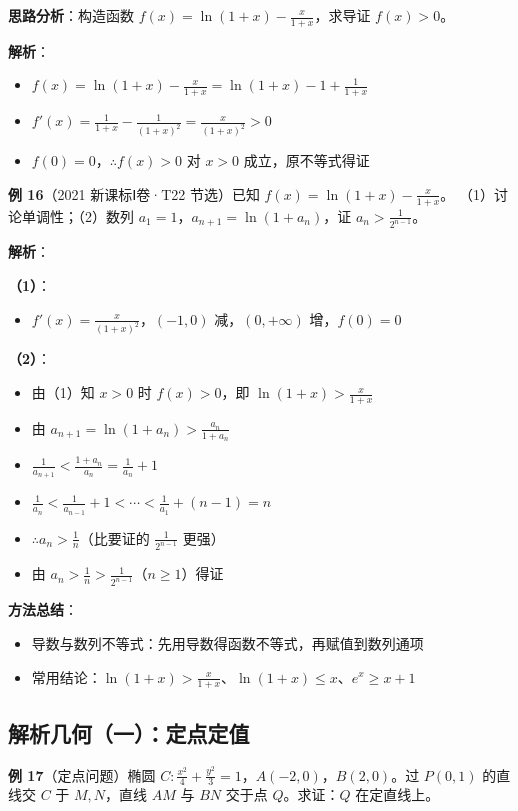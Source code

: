 \textbf{思路分析}：构造函数 $f(x)=\ln(1+x)-\frac{x}{1+x}$，求导证 $f(x)>0$。

\textbf{解析}：
\begin{itemize}
  \item $f(x)=\ln(1+x)-\frac{x}{1+x}=\ln(1+x)-1+\frac1{1+x}$
  \item $f'(x)=\frac1{1+x}-\frac1{(1+x)^2}=\frac{x}{(1+x)^2}>0$
  \item $f(0)=0$，$\therefore f(x)>0$ 对 $x>0$ 成立，原不等式得证
\end{itemize}

\textbf{例 16}（2021 新课标Ⅰ卷·T22 节选）已知 $f(x)=\ln(1+x)-\frac{x}{1+x}$。
（1）讨论单调性；（2）数列 $a_1=1$，$a_{n+1}=\ln(1+a_n)$，证 $a_n>\frac1{2^{n-1}}$。

\textbf{解析}：

\textbf{（1）}：
\begin{itemize}
  \item $f'(x)=\frac{x}{(1+x)^2}$，$(-1,0)$ 减，$(0,+\infty)$ 增，$f(0)=0$
\end{itemize}

\textbf{（2）}：
\begin{itemize}
  \item 由（1）知 $x>0$ 时 $f(x)>0$，即 $\ln(1+x)>\frac{x}{1+x}$
  \item 由 $a_{n+1}=\ln(1+a_n) > \frac{a_n}{1+a_n}$
  \item $\frac1{a_{n+1}} < \frac{1+a_n}{a_n} = \frac1{a_n}+1$
  \item $\frac1{a_n} < \frac1{a_{n-1}}+1 < \cdots < \frac1{a_1}+(n-1) = n$
  \item $\therefore a_n > \frac1n$（比要证的 $\frac1{2^{n-1}}$ 更强）
  \item 由 $a_n>\frac1n > \frac1{2^{n-1}}$（$n\ge1$）得证
\end{itemize}

\textbf{方法总结}：
\begin{itemize}
  \item 导数与数列不等式：先用导数得函数不等式，再赋值到数列通项
  \item 常用结论：$\ln(1+x)>\frac{x}{1+x}$、$\ln(1+x)\le x$、$e^x\ge x+1$
\end{itemize}

\subsection{解析几何（一）：定点定值}

\textbf{例 17}（定点问题）椭圆 $C:\frac{x^2}{4}+\frac{y^2}{3}=1$，$A(-2,0)$，$B(2,0)$。过 $P(0,1)$ 的直线交 $C$ 于 $M,N$，直线 $AM$ 与 $BN$ 交于点 $Q$。求证：$Q$ 在定直线上。

